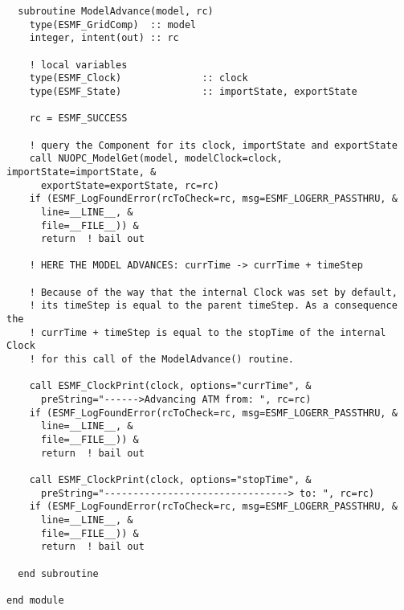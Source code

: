  \begin{verbatim}
  subroutine ModelAdvance(model, rc)
    type(ESMF_GridComp)  :: model
    integer, intent(out) :: rc
    
    ! local variables
    type(ESMF_Clock)              :: clock
    type(ESMF_State)              :: importState, exportState

    rc = ESMF_SUCCESS
    
    ! query the Component for its clock, importState and exportState
    call NUOPC_ModelGet(model, modelClock=clock, importState=importState, &
      exportState=exportState, rc=rc)
    if (ESMF_LogFoundError(rcToCheck=rc, msg=ESMF_LOGERR_PASSTHRU, &
      line=__LINE__, &
      file=__FILE__)) &
      return  ! bail out

    ! HERE THE MODEL ADVANCES: currTime -> currTime + timeStep
    
    ! Because of the way that the internal Clock was set by default,
    ! its timeStep is equal to the parent timeStep. As a consequence the
    ! currTime + timeStep is equal to the stopTime of the internal Clock
    ! for this call of the ModelAdvance() routine.
    
    call ESMF_ClockPrint(clock, options="currTime", &
      preString="------>Advancing ATM from: ", rc=rc)
    if (ESMF_LogFoundError(rcToCheck=rc, msg=ESMF_LOGERR_PASSTHRU, &
      line=__LINE__, &
      file=__FILE__)) &
      return  ! bail out
    
    call ESMF_ClockPrint(clock, options="stopTime", &
      preString="--------------------------------> to: ", rc=rc)
    if (ESMF_LogFoundError(rcToCheck=rc, msg=ESMF_LOGERR_PASSTHRU, &
      line=__LINE__, &
      file=__FILE__)) &
      return  ! bail out

  end subroutine

end module
 
\end{verbatim}

\setlength{\parskip}{\oldparskip}
\setlength{\parindent}{\oldparindent}
\setlength{\baselineskip}{\oldbaselineskip}
